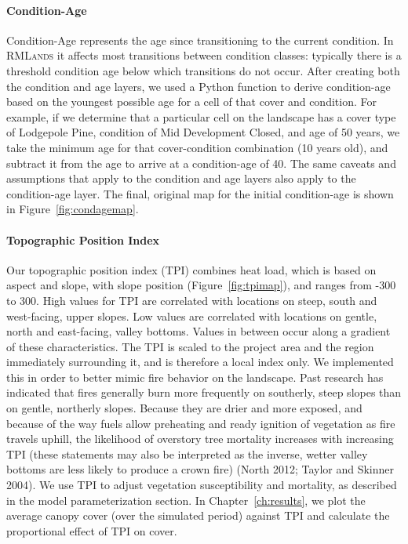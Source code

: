 \paragraph{Condition-Age}
Condition-Age represents the age since transitioning to the current condition. In \textsc{RMLands} it affects most transitions between condition classes: typically there is a threshold condition age below which transitions do not occur. After creating both the condition and age layers, we used a Python function to derive condition-age based on the youngest possible age for a cell of that cover and condition. For example, if we determine that a particular cell on the landscape has a cover type of Lodgepole Pine, condition of Mid Development Closed, and age of 50 years, we take the minimum age for that cover-condition combination (10 years old), and subtract it from the age to arrive at a condition-age of 40. The same caveats and assumptions that apply to the condition and age layers also apply to the condition-age layer. The final, original map for the initial condition-age is shown in Figure~\ref{fig:condagemap}.


\paragraph{Topographic Position Index}
Our topographic position index (TPI) combines heat load, which is based on aspect and slope, with slope position (Figure~\ref{fig:tpimap}), and ranges from -300 to 300. High values for TPI are correlated with locations on steep, south and west-facing, upper slopes. Low values are correlated with locations on gentle, north and east-facing, valley bottoms. Values in between occur along a gradient of these characteristics. The TPI is scaled to the project area and the region immediately surrounding it, and is therefore a local index only. We implemented this in order to better mimic fire behavior on the landscape. Past research has indicated that fires generally burn more frequently on southerly, steep slopes than on gentle, northerly slopes. Because they are drier and more exposed, and because of the way fuels allow preheating and ready ignition of vegetation as fire travels uphill, the likelihood of overstory tree mortality increases with increasing TPI (these statements may also be interpreted as the inverse, wetter valley bottoms are less likely to produce a crown fire) (North 2012; Taylor and Skinner 2004). We use TPI to adjust vegetation susceptibility and mortality, as described in the model parameterization section. In Chapter~\ref{ch:results}, we plot the average canopy cover (over the simulated period) against TPI and calculate the proportional effect of TPI on cover.



